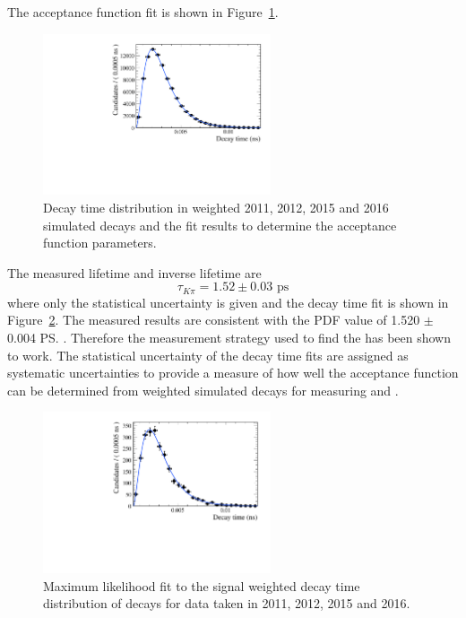 The acceptance function fit is shown in Figure~\ref{fig:bdkpiacceptancefit}. 

\begin{figure}[htbp]
\centering
  \includegraphics[width=0.6\textwidth]{./Figs/LifetimeSystematics/Bd2KPi_acceptance_fit.pdf}
\caption{Decay time distribution in weighted 2011, 2012, 2015 and 2016 simulated decays and the \ml fit results to determine the acceptance function parameters. }
\label{fig:bdkpiacceptancefit}
\end{figure}

The measured \bdkpi lifetime and inverse lifetime are
\begin{equation}
\tau_{K\pi} = 1.52 \pm 0.03  \text{ ps} 
\end{equation}
where only the statistical uncertainty is given and the decay time fit is shown in Figure~\ref{fig:bdkpilifetimefit}. The measured results are consistent with the PDF value of 1.520 $\pm$ 0.004 \ps. Therefore the measurement strategy used to find the \bsmumu \el has been shown to work. The statistical uncertainty of the \bdkpi decay time fits are assigned as systematic uncertainties to provide a measure of how well the acceptance function can be determined from weighted simulated decays for measuring \tmumu and \Gmumu. 

\begin{figure}[htbp]
\centering
  \includegraphics[width=0.6\textwidth]{./Figs/LifetimeSystematics/Bd2KPi_lifetime_fit.pdf}
\caption{Maximum likelihood fit to the signal weighted decay time distribution of \bdkpi decays for data taken in 2011, 2012, 2015 and 2016. }
\label{fig:bdkpilifetimefit}
\end{figure}

